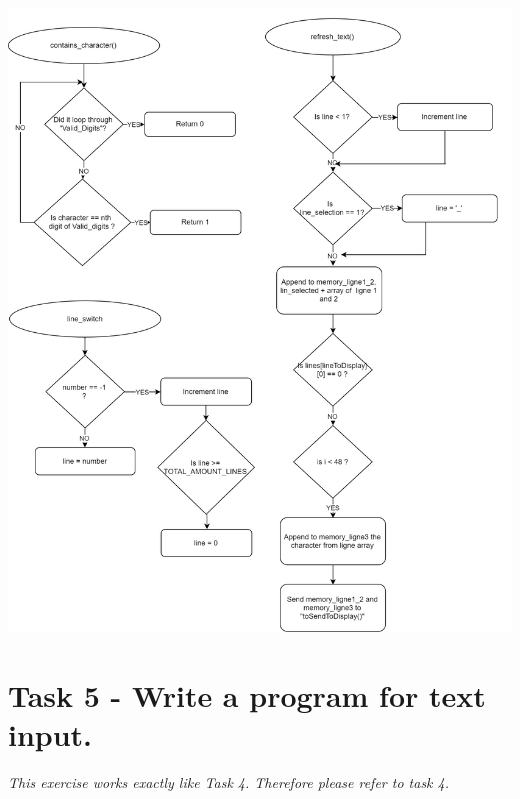 \documentclass[a4paper,12pt]{article}
\begin{document}
\begin{center}
\includegraphics[scale=0.5]{img/Task4-2.png}
\end{center}
\newpage
\section{Task 5 - Write a program for text input. }
\textit{This exercise works exactly like Task 4. Therefore please refer to task 4.}



\end{document}
